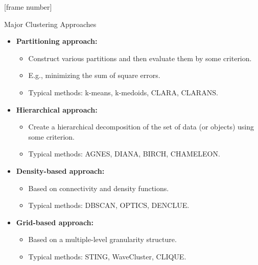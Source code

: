 \documentclass[aspectratio=169,t,xcolor=dvipsnames]{beamer}
\begin{document}
  {
    [frame number]
    \begin{frame}{Major Clustering Approaches}
        \begin{itemize}
          \item \textbf{Partitioning approach:}
          \begin{itemize}
            \item Construct various partitions and then evaluate them by some criterion.
            \item E.g., minimizing the sum of square errors.
            \item Typical methods: k-means, k-medoids, CLARA, CLARANS.
          \end{itemize}
          \item \textbf{Hierarchical approach:}
          \begin{itemize}
            \item Create a hierarchical decomposition of the set of data (or objects) using some criterion.
            \item Typical methods: AGNES, DIANA, BIRCH, CHAMELEON.
          \end{itemize}
          \item \textbf{Density-based approach:}
          \begin{itemize}
            \item Based on connectivity and density functions.
            \item Typical methods: DBSCAN, OPTICS, DENCLUE.
          \end{itemize}
          \item \textbf{Grid-based approach:}
          \begin{itemize}
            \item Based on a multiple-level granularity structure.
            \item Typical methods: STING, WaveCluster, CLIQUE.
          \end{itemize}
        \end{itemize}
    \end{frame}
  }
\end{document}
